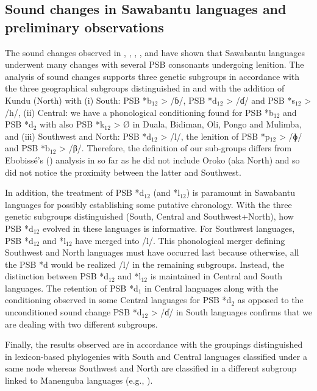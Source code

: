 \documentclass[output=paper,colorlinks,citecolor=brown
]{langscibook}
\begin{document}
\subsection{Sound changes in Sawabantu languages and preliminary observations} \label{sect:browngrollemundrule:observations}

The sound changes observed in , , , , and  have shown that Sawabantu languages underwent many changes with several PSB consonants undergoing lenition. The analysis of sound changes supports three genetic subgroups in accordance with the three geographical subgroups distinguished in \citet{ebobisse1989} and \citet{ebobisse2015} with the addition of Kundu (North) with (i) South: PSB *b$_{12}$ > /ɓ/, PSB *d$_{12}$ > /ɗ/ and PSB *s$_{12}$ > /h/, (ii) Central: we have a phonological conditioning found for PSB *b$_{12}$ and PSB *d$_2$ with also PSB *k$_{12}$ > Ø in Duala, Bidiman, Oli, Pongo and Mulimba, and (iii) Southwest and North: PSB *d$_{12}$ > /l/, the lenition of PSB *p$_{12}$ > /ɸ/ and PSB *b$_{12}$ > /β/. Therefore, the definition of our sub-groups differs from Ebobissé’s (\citeyear{ebobisse1989}) analysis in so far as he did not include Oroko (aka North) and so did not notice the proximity between the latter and Southwest.

In addition, the treatment of PSB *d$_{12}$ (and *l$_{12}$) is paramount in Sawabantu languages for possibly establishing some putative chronology. With the three genetic subgroups distinguished (South, Central and Southwest+North), how PSB *d$_{12}$ evolved in these languages is informative. For Southwest languages, PSB *d$_{12}$ and *l$_{12}$ have merged into /l/. This phonological merger defining Southwest and North languages must have occurred last because otherwise, all the PSB *d would be realized /l/ in the remaining subgroups. Instead, the distinction between PSB *d$_{12}$ and *l$_{12}$ is maintained in Central and South languages. The retention of PSB *d$_1$ in Central languages along with the conditioning observed in some Central languages for PSB *d$_2$ as opposed to the unconditioned sound change PSB *d$_{12}$ > /ɗ/ in South languages confirms that we are dealing with two different subgroups. 

Finally, the results observed are in accordance with the groupings distinguished in lexicon-based phylogenies with South and Central languages classified under a same node whereas Southwest and North are classified in a different subgroup linked to Manenguba languages (e.g., ).
\end{document}
